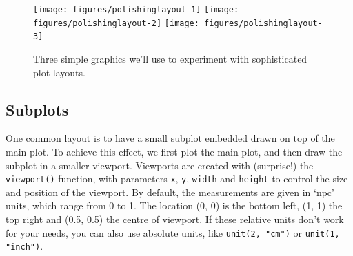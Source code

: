 \begin{Shaded}
\begin{Highlighting}[]
\StringTok{ }  \NormalTok{))}
\StringTok{ } \StringTok{ }
\StringTok{  }\NormalTok{(} 
\StringTok{ } \NormalTok{))}
\end{Highlighting}
\end{Shaded}

\begin{figure}

{\centering \texttt{[image: figures/polishinglayout-1]} \texttt{[image: figures/polishinglayout-2]} \texttt{[image: figures/polishinglayout-3]} 

}

\caption{Three simple graphics we'll use to experiment with sophisticated plot layouts.\label{fig:layout}}
\end{figure}

\subsection{Subplots}

One common layout is to have a small subplot embedded drawn on top of
the main plot. To achieve this effect, we first plot the main plot, and
then draw the subplot in a smaller viewport. Viewports are created with
(surprise!) the \texttt{viewport()} function, with parameters
\texttt{x}, \texttt{y}, \texttt{width} and \texttt{height} to control
the size and position of the viewport. By default, the measurements are
given in `npc' units, which range from 0 to 1. The location (0, 0) is
the bottom left, (1, 1) the top right and (0.5, 0.5) the centre of
viewport. If these relative units don't work for your needs, you can
also use absolute units, like \texttt{unit(2, "cm")} or
\texttt{unit(1, "inch")}.  


